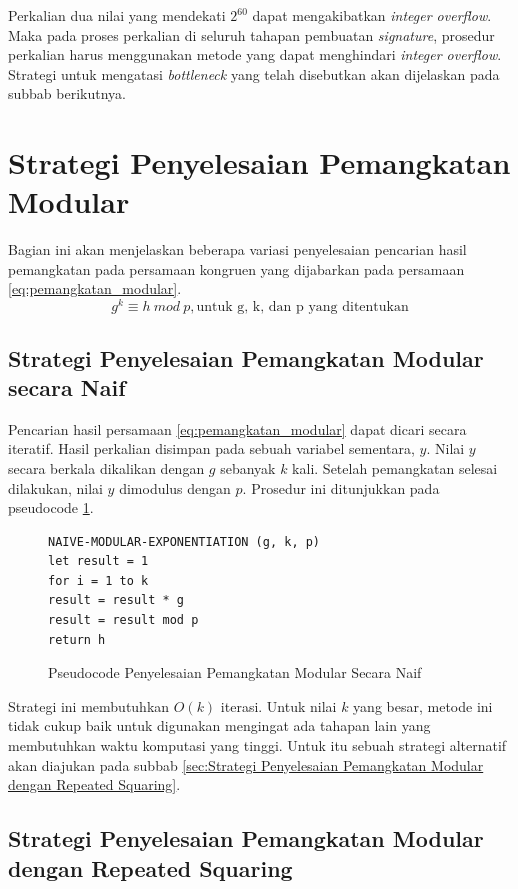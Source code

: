 Perkalian dua nilai yang mendekati $2^{60}$ dapat mengakibatkan \textit{integer overflow}. Maka pada proses perkalian di seluruh tahapan pembuatan \textit{signature}, prosedur perkalian harus menggunakan metode yang dapat menghindari \textit{integer overflow}. Strategi untuk mengatasi \textit{bottleneck} yang telah disebutkan akan dijelaskan pada subbab berikutnya.

\section{Strategi Penyelesaian Pemangkatan Modular}
Bagian ini akan menjelaskan beberapa variasi penyelesaian pencarian hasil pemangkatan pada persamaan kongruen yang dijabarkan pada persamaan \eqref{eq:pemangkatan_modular}.
\begin{equation}
g^k \equiv h\ mod\ p,\text{untuk g, k, dan p yang ditentukan}
\label{eq:pemangkatan_modular}
\end{equation}

\subsection{Strategi Penyelesaian Pemangkatan Modular secara Naif}
Pencarian hasil persamaan \eqref{eq:pemangkatan_modular} dapat dicari secara iteratif. Hasil perkalian disimpan pada sebuah variabel sementara, $y$. Nilai $y$ secara berkala dikalikan dengan $g$ sebanyak $k$ kali. Setelah pemangkatan selesai dilakukan, nilai $y$ dimodulus dengan $p$. Prosedur ini ditunjukkan pada pseudocode \ref{psdo:modex_naive}.

\begin{figure}
\begin{lstlisting}[firstnumber=0]
NAIVE-MODULAR-EXPONENTIATION (g, k, p)
let result = 1
for i = 1 to k
result = result * g
result = result mod p
return h
\end{lstlisting}
\caption{Pseudocode Penyelesaian Pemangkatan Modular Secara Naif}
\label{psdo:modex_naive}
\end{figure}

Strategi ini membutuhkan $O(k)$ iterasi. Untuk nilai $k$ yang besar, metode ini tidak cukup baik untuk digunakan mengingat ada tahapan lain yang membutuhkan waktu komputasi yang tinggi. Untuk itu sebuah strategi alternatif akan diajukan pada subbab \ref{sec:Strategi Penyelesaian Pemangkatan Modular dengan Repeated Squaring}.

\subsection{Strategi Penyelesaian Pemangkatan Modular dengan Repeated Squaring}

